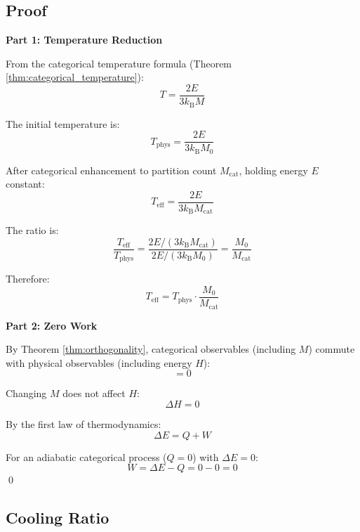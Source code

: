 \documentclass[twocolumn,10pt,twoside]{article}
\newcommand{\kb}{k_{\mathrm{B}}}
\newcommand{\Teff}{T_{\mathrm{eff}}}
\newcommand{\Tphys}{T_{\mathrm{phys}}}
\newcommand{\Mcat}{M_{\mathrm{cat}}}
\begin{document}
\subsection{Proof}

\textbf{Part 1: Temperature Reduction}

From the categorical temperature formula (Theorem \ref{thm:categorical_temperature}):
\begin{equation}
T = \frac{2E}{3\kb M}
\end{equation}

The initial temperature is:
\begin{equation}
\Tphys = \frac{2E}{3\kb M_0}
\end{equation}

After categorical enhancement to partition count $\Mcat$, holding energy $E$ constant:
\begin{equation}
\Teff = \frac{2E}{3\kb \Mcat}
\end{equation}

The ratio is:
\begin{equation}
\frac{\Teff}{\Tphys} = \frac{2E/(3\kb \Mcat)}{2E/(3\kb M_0)} = \frac{M_0}{\Mcat}
\end{equation}

Therefore:
\begin{equation}
\Teff = \Tphys \cdot \frac{M_0}{\Mcat}
\end{equation}

\textbf{Part 2: Zero Work}

By Theorem \ref{thm:orthogonality}, categorical observables (including $M$) commute with physical observables (including energy $H$):
\begin{equation}
[M, H] = 0
\end{equation}

Changing $M$ does not affect $H$:
\begin{equation}
\Delta H = 0
\end{equation}

By the first law of thermodynamics:
\begin{equation}
\Delta E = Q + W
\end{equation}

For an adiabatic categorical process ($Q = 0$) with $\Delta E = 0$:
\begin{equation}
W = \Delta E - Q = 0 - 0 = 0
\end{equation}
\qed

\subsection{Cooling Ratio}
\end{document}

